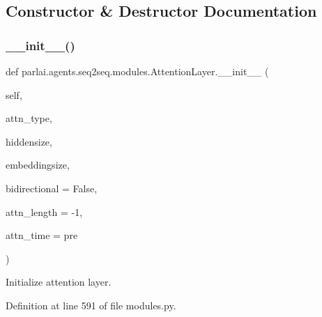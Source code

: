 \subsection{Constructor \& Destructor Documentation}
\mbox{\label{classparlai_1_1agents_1_1seq2seq_1_1modules_1_1AttentionLayer_aca18372fe25dbf5132ebcb2e63de31e3}} 
\subsubsection{\texorpdfstring{\+\_\+\+\_\+init\+\_\+\+\_\+()}{\_\_init\_\_()}}
{\footnotesize\ttfamily def parlai.\+agents.\+seq2seq.\+modules.\+Attention\+Layer.\+\_\+\+\_\+init\+\_\+\+\_\+ (\begin{DoxyParamCaption}\item[{}]{self,  }\item[{}]{attn\+\_\+type,  }\item[{}]{hiddensize,  }\item[{}]{embeddingsize,  }\item[{}]{bidirectional = {\ttfamily False},  }\item[{}]{attn\+\_\+length = {\ttfamily -\/1},  }\item[{}]{attn\+\_\+time = {\ttfamily \textquotesingle{}pre\textquotesingle{}} }\end{DoxyParamCaption})}

\begin{DoxyVerb}Initialize attention layer.
\end{DoxyVerb}
 

Definition at line 591 of file modules.\+py.


